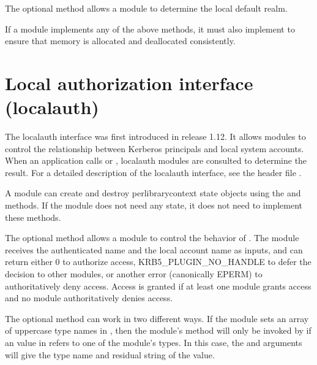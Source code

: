\documentclass[letterpaper,10pt,english]{sphinxmanual}
\begin{document}
\sphinxAtStartPar
The optional  method allows a module to determine the
local default realm.

\sphinxAtStartPar
If a module implements any of the above methods, it must also
implement  to ensure that memory is allocated and
deallocated consistently.


\section{Local authorization interface (localauth)}
\label{\detokenize{plugindev/localauth:local-authorization-interface-localauth}}\label{\detokenize{plugindev/localauth:localauth-plugin}}\label{\detokenize{plugindev/localauth::doc}}
\sphinxAtStartPar
The localauth interface was first introduced in release 1.12.  It
allows modules to control the relationship between Kerberos principals
and local system accounts.  When an application calls
 or , localauth
modules are consulted to determine the result.  For a detailed
description of the localauth interface, see the header file
.

\sphinxAtStartPar
A module can create and destroy per\sphinxhyphen{}library\sphinxhyphen{}context state objects
using the  and  methods.  If the module does not need
any state, it does not need to implement these methods.

\sphinxAtStartPar
The optional  method allows a module to control the behavior
of .  The module receives the authenticated name
and the local account name as inputs, and can return either 0 to
authorize access, KRB5\_PLUGIN\_NO\_HANDLE to defer the decision to other
modules, or another error (canonically EPERM) to authoritatively deny
access.  Access is granted if at least one module grants access and no
module authoritatively denies access.

\sphinxAtStartPar
The optional  method can work in two different ways.  If the
module sets an array of uppercase type names in , then
the module’s  method will only be invoked by
 if an  value in
 refers to one of the module’s types.  In this
case, the  and  arguments will give the type name and
residual string of the  value.
\end{document}

